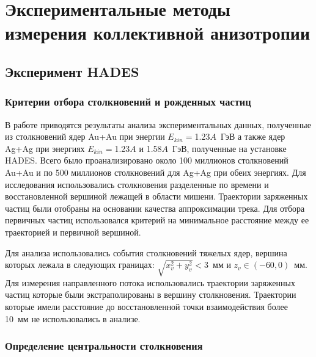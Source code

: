 \chapter{Экспериментальные методы измерения коллективной анизотропии}

\section{Эксперимент HADES}

\subsection{Критерии отбора столкновений и рожденных частиц}

В работе приводятся результаты анализа экспериментальных данных, полученные из столкновений ядер Au+Au при энергии $E_{kin}=$1.23$A$~ГэВ а также ядер Ag+Ag при энергиях $E_{kin}=$1.23$A$ и 1.58$A$~ГэВ, полученные на установке HADES.
Всего было проанализировано около 100 миллионов столкновений Au+Au и по 500 миллионов столкновений для Ag+Ag при обеих энергиях.
Для исследования использовались столкновения разделенные по времени и восстановленной вершиной лежащей в области мишени.
Траектории заряженных частиц были отобраны на основании качества аппроксимации трека.
Для отбора первичных частиц использовался критерий на минимальное расстояние между ее траекторией и первичной вершиной. 

Для анализа использовались события столкновений тяжелых ядер, вершина которых лежала в следующих границах: $\sqrt{x_v^2+y_v^2}<3$~мм и $z_v \in (-60, 0)$~мм.
Для измерения направленного потока использовались траектории заряженных частиц которые были экстраполированы в вершину столкновения.
Траектории которые имели расстояние до восстановленной точки взаимодействия более 10~мм не использовались в анализе.

\subsection{Определение центральности столкновения}

